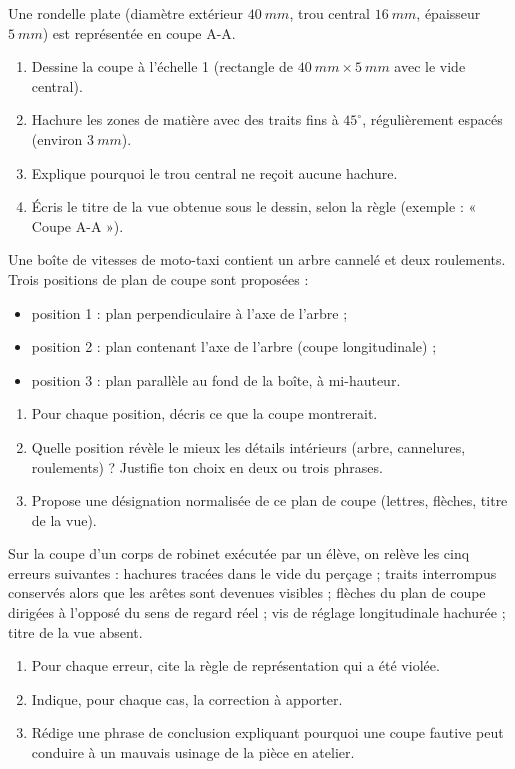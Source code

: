 \documentclass[11pt]{article}
\begin{document}
\begin{exercice}
Une rondelle plate (diamètre extérieur $\SI{40}{mm}$, trou central $\SI{16}{mm}$, épaisseur $\SI{5}{mm}$) est représentée en coupe A-A.
\begin{enumerate}
\item Dessine la coupe à l'échelle 1 (rectangle de $\SI{40}{mm} \times \SI{5}{mm}$ avec le vide central).
\item Hachure les zones de matière avec des traits fins à $45^{\circ}$, régulièrement espacés (environ $\SI{3}{mm}$).
\item Explique pourquoi le trou central ne reçoit aucune hachure.
\item Écris le titre de la vue obtenue sous le dessin, selon la règle (exemple : « Coupe A-A »).
\end{enumerate}
\end{exercice}

\begin{exercice}
Une boîte de vitesses de moto-taxi contient un arbre cannelé et deux roulements. Trois positions de plan de coupe sont proposées :
\begin{itemize}
\item position 1 : plan perpendiculaire à l'axe de l'arbre ;
\item position 2 : plan contenant l'axe de l'arbre (coupe longitudinale) ;
\item position 3 : plan parallèle au fond de la boîte, à mi-hauteur.
\end{itemize}
\begin{enumerate}
\item Pour chaque position, décris ce que la coupe montrerait.
\item Quelle position révèle le mieux les détails intérieurs (arbre, cannelures, roulements) ? Justifie ton choix en deux ou trois phrases.
\item Propose une désignation normalisée de ce plan de coupe (lettres, flèches, titre de la vue).
\end{enumerate}
\end{exercice}

\begin{exercice}
Sur la coupe d'un corps de robinet exécutée par un élève, on relève les cinq erreurs suivantes : hachures tracées dans le vide du perçage ; traits interrompus conservés alors que les arêtes sont devenues visibles ; flèches du plan de coupe dirigées à l'opposé du sens de regard réel ; vis de réglage longitudinale hachurée ; titre de la vue absent.
\begin{enumerate}
\item Pour chaque erreur, cite la règle de représentation qui a été violée.
\item Indique, pour chaque cas, la correction à apporter.
\item Rédige une phrase de conclusion expliquant pourquoi une coupe fautive peut conduire à un mauvais usinage de la pièce en atelier.
\end{enumerate}
\end{exercice}
\end{document}
